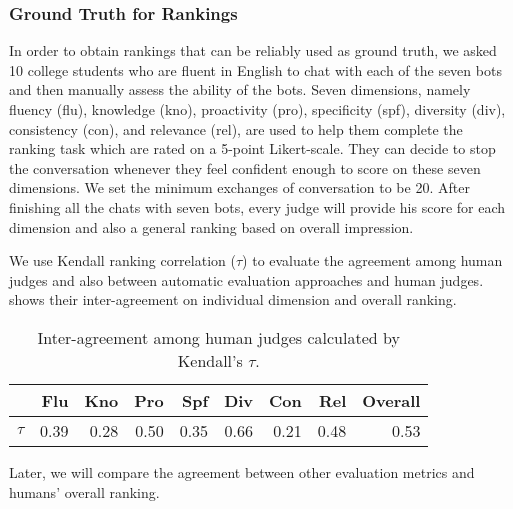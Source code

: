 \subsubsection*{Ground Truth for Rankings}
 In order to obtain rankings that can be reliably used as ground truth, 
we asked 10 college students who are fluent in English to chat 
with each of the seven bots and then manually assess the ability of 
the bots. Seven dimensions, namely fluency (flu), 
knowledge (kno), proactivity (pro), specificity (spf), 
diversity (div), consistency (con), and relevance (rel), 
are used to help them complete the ranking task 
which are rated on a 5-point Likert-scale. They can decide to 
stop the conversation whenever they feel confident enough to score
on these seven dimensions. We set the minimum exchanges of conversation 
to be 20. After finishing all the chats with seven bots,  
every judge will provide his score for each dimension
 and also a general ranking based on overall impression.


We use Kendall ranking correlation ($\tau$) to evaluate the agreement 
among human judges and also between automatic evaluation approaches and human judges. 
 shows their inter-agreement on individual dimension and overall ranking.

\begin{table}[ht!]
\centering
\scriptsize
\begin{tabular}{lrrrrrrrr}
\toprule
& Flu& Kno& Pro& Spf& Div& Con & Rel & Overall \\ \midrule
$\tau$ & 0.39 &0.28 &0.50 &0.35 &0.66 &0.21 &0.48 & 0.53  \\
\bottomrule
\end{tabular}
\caption{Inter-agreement among human judges calculated by Kendall's $\tau$.}
\label{tab:inter}
\end{table}
 
Later, we will compare the agreement between other evaluation metrics and humans' overall ranking.  


